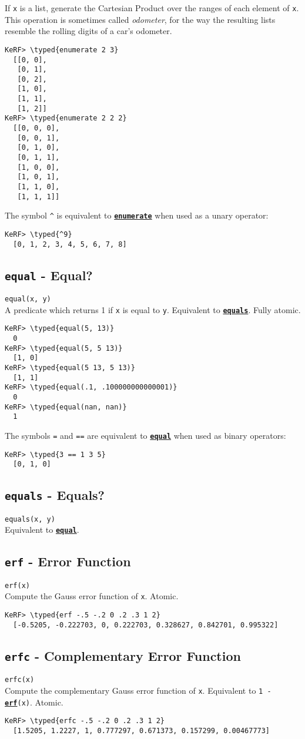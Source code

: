 \documentclass{article}
\newcommand{\typed}[1]{\textcolor{TealBlue}{#1}}
\newcommand{\primdefu}[3]{\subsection{\texttt{#1} - #2}\label{prim:#3}}
\newcommand{\primu}[2]{\hyperref[prim:#2]{\textbf{\texttt{#1}}}}
\newcommand{\primdef}[2]{\primdefu{#1}{#2}{#1}}
\newcommand{\prim}[1]{\primu{#1}{#1}}
\begin{document}
If \texttt{x} is a list, generate the Cartesian Product over the ranges of each element of \texttt{x}. This operation is sometimes called \emph{odometer}, for the way the resulting lists resemble the rolling digits of a car's odometer.
\begin{Verbatim}
KeRF> \typed{enumerate 2 3}
  [[0, 0], 
   [0, 1], 
   [0, 2], 
   [1, 0], 
   [1, 1], 
   [1, 2]]
KeRF> \typed{enumerate 2 2 2}
  [[0, 0, 0], 
   [0, 0, 1], 
   [0, 1, 0], 
   [0, 1, 1], 
   [1, 0, 0], 
   [1, 0, 1], 
   [1, 1, 0], 
   [1, 1, 1]]
\end{Verbatim}

The symbol \texttt{\^} is equivalent to \prim{enumerate} when used as a unary operator:
\begin{Verbatim}
KeRF> \typed{^9}
  [0, 1, 2, 3, 4, 5, 6, 7, 8]
\end{Verbatim}

\primdef{equal}{Equal?}
\texttt{equal(x, y)}\\

A predicate which returns 1 if \texttt{x} is equal to \texttt{y}. Equivalent to \prim{equals}. Fully atomic.
\begin{Verbatim}
KeRF> \typed{equal(5, 13)}
  0
KeRF> \typed{equal(5, 5 13)}
  [1, 0]
KeRF> \typed{equal(5 13, 5 13)}
  [1, 1]
KeRF> \typed{equal(.1, .100000000000001)}
  0
KeRF> \typed{equal(nan, nan)}
  1
\end{Verbatim}

The symbols \texttt{=} and \texttt{==} are equivalent to \prim{equal} when used as binary operators:
\begin{Verbatim}
KeRF> \typed{3 == 1 3 5}
  [0, 1, 0]
\end{Verbatim}

\primdef{equals}{Equals?}
\texttt{equals(x, y)}\\

Equivalent to \prim{equal}.

\primdef{erf}{Error Function}
\texttt{erf(x)}\\

Compute the Gauss error function of \texttt{x}. Atomic.
\begin{Verbatim}
KeRF> \typed{erf -.5 -.2 0 .2 .3 1 2}
  [-0.5205, -0.222703, 0, 0.222703, 0.328627, 0.842701, 0.995322]
\end{Verbatim}

\primdef{erfc}{Complementary Error Function}
\texttt{erfc(x)}\\

Compute the complementary Gauss error function of \texttt{x}. Equivalent to \texttt{1 - \prim{erf}(x)}. Atomic.
\begin{Verbatim}
KeRF> \typed{erfc -.5 -.2 0 .2 .3 1 2}
  [1.5205, 1.2227, 1, 0.777297, 0.671373, 0.157299, 0.00467773]
\end{Verbatim}
\end{document}
